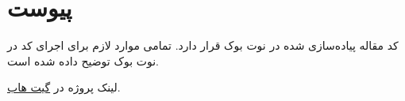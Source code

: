 \newpage
\section*{پیوست}
\RTL
کد مقاله پیاده‌سازی شده در نوت بوک 
قرار دارد. تمامی موارد لازم برای اجرای کد در نوت بوک توضیح داده شده است.

لینک پروژه در
\href{https://github.com/maryamhashemi/Transfer-Learning}{گیت هاب}.